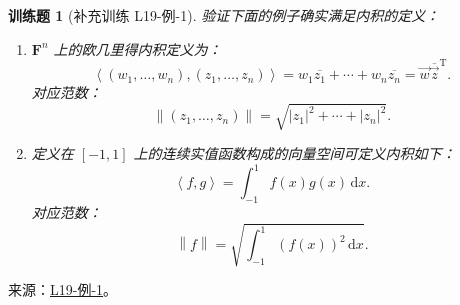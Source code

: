 \documentclass[UTF8,12pt,a4paper,fontset=fandol]{ctexart}
\newtheorem{exercise}{训练题}[section]
\begin{document}
\begin{exercise}[补充训练 L19-例-1]\label{prob:L19-例-1}
验证下面的例子确实满足内积的定义：
    \begin{enumerate}
        \item $\mathbf{F}^{n}$ 上的欧几里得内积定义为：
              \[\left\langle (w_1, \ldots, w_n), (z_1, \ldots, z_n)\right\rangle = w_1\overline{z_1} + \cdots + w_n\overline{z_n} = \vec{w}\overline{\vec{z}}^{\mathrm{T}}.\]
              对应范数：
              \[\left\lVert (z_1, \ldots, z_n) \right\rVert  = \sqrt{\lvert z_1 \rvert^2 + \cdots + \lvert z_n \rvert^2}.\]

        \item \label{item:23:内积和范数:2}
              定义在 $ \left[-1, 1\right] $ 上的连续实值函数构成的向量空间可定义内积如下：
              \[\left\langle f, g\right\rangle = \int_{-1}^1f(x)g(x)\,\mathrm{d}x.\]
              对应范数：
              \[\left\lVert f \right\rVert = \sqrt{\int_{-1}^1(f(x))^2\,\mathrm{d}x}.\]
    \end{enumerate}
\end{exercise}
\noindent 来源：\href{https://github.com/yhwu-is/Linear-Algebra-Left-Undone/blob/new/%E8%AE%B2%E4%B9%89/%E4%B8%93%E9%A2%98/19%20%E5%86%85%E7%A7%AF%E7%A9%BA%E9%97%B4.tex}{L19-例-1}。
\end{document}
